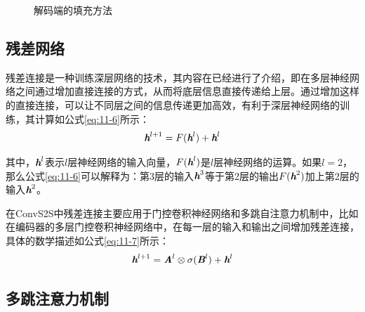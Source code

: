 \begin{figure}[htp]
\centering

\caption{解码端的填充方法}
\label{fig:11-15}
\end{figure}


\subsection{残差网络}
\label{sec:11.2.3}

\parinterval 残差连接是一种训练深层网络的技术，其内容在{\chapternine}已经进行了介绍，即在多层神经网络之间通过增加直接连接的方式，从而将底层信息直接传递给上层。通过增加这样的直接连接，可以让不同层之间的信息传递更加高效，有利于深层神经网络的训练，其计算如公式\eqref{eq:11-6}所示：
\begin{eqnarray}
\textbf{\em h}^{l+1} = F (\textbf{\em h}^l) + \textbf{\em h}^l
\label{eq:11-6}
\end{eqnarray}

\noindent 其中，$\textbf{\em h}^l$表示$l$层神经网络的输入向量，${F} (\textbf{\em h}^l)$是$l$层神经网络的运算。如果$l=2$，那么公式\eqref{eq:11-6}可以解释为：第3层的输入$\textbf{\em h}^3$等于第2层的输出${F}(\textbf{\em h}^2)$加上第2层的输入$\textbf{\em h}^2$。

\parinterval 在ConvS2S中残差连接主要应用于门控卷积神经网络和多跳自注意力机制中，比如在编码器的多层门控卷积神经网络中，在每一层的输入和输出之间增加残差连接，具体的数学描述如公式\eqref{eq:11-7}所示：
\begin{eqnarray}
\textbf{\em h}^{l+1} = \textbf{\em A}^{l} \otimes \sigma ( \textbf{\em B}^{l} ) + \textbf{\em h}^{l}
\label{eq:11-7}
\end{eqnarray}



\subsection{多跳注意力机制}

